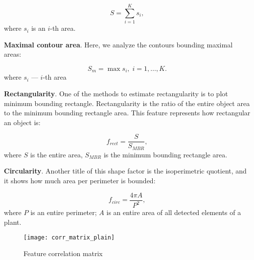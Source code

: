 \begin{equation}
	\label{eq:4}
	 S = \sum_{i=1}^{K}s_i,
\end{equation}
where $s_i$ is an $i$-th area.

\vspace{1cm}

\textbf{Maximal contour area}. Here, we analyze the contours bounding maximal areas:

\begin{equation}
	\label{eq:5}
	 S_m = \max{s_i}, \; i = 1, \dots, K.
\end{equation}
where $s_i$ –– $i$-th area

\vspace{1cm}

\textbf{Rectangularity}. One of the methods to estimate rectangularity is to plot minimum bounding rectangle. Rectangularity is the ratio of the entire object area to the minimum bounding rectangle area. This feature represents how rectangular an object is:

\begin{equation}
	f_{rect} = \frac{S}{S_{MBR}},
	\label{eq:6}
\end{equation}
where $S$ is the entire area, $S_{MBR}$ is the minimum bounding rectangle area.

\vspace{1cm}

\textbf{Circularity}. Another title of this shape factor is the isoperimetric quotient, and it shows how much area per perimeter is bounded:

\begin{equation}
	f_{circ} = \frac{4 \pi A}{P^2},
	\label{eq:7}
\end{equation}
where $P$ is an entire perimeter; $A$ is an entire area of all detected elements of a plant.


\begin{figure}[h]
	\centering
	\texttt{[image: corr\_matrix\_plain]}
	\caption{Feature correlation matrix}
	\label{fig_corr_matrix}
\end{figure}


